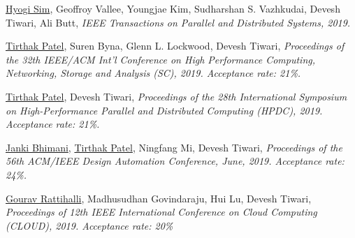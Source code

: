 
{\textnormal{\newline \underline{Hyogi Sim}, Geoffroy Vallee, Youngjae Kim, Sudharshan S. Vazhkudai, Devesh Tiwari, Ali Butt, }} {\textit{IEEE Transactions on Parallel and Distributed Systems, 2019.\newline}}{}{}{} %

{\textnormal{\newline \underline{Tirthak Patel}, Suren Byna, Glenn L. Lockwood, Devesh Tiwari,}} {\textit{Proceedings of the 32th IEEE/ACM Int'l Conference on High Performance Computing, Networking, Storage and Analysis (SC), 2019. Acceptance rate: 21\%. \newline}}{}{}{} %

{\textnormal{\newline \underline{Tirthak Patel}, Devesh Tiwari,}} {\textit{ Proceedings of the 28th International Symposium on High-Performance Parallel and Distributed Computing (HPDC), 2019. Acceptance rate: 21\%. \newline}}{}{}{} %

{\textnormal{\newline \underline{Janki Bhimani}, \underline{Tirthak Patel}, Ningfang Mi, Devesh Tiwari,}} {\textit{Proceedings of the 56th ACM/IEEE Design Automation Conference, June, 2019. Acceptance rate: 24\%.\newline}}{}{}{} %

{\textnormal{\newline \underline{Gourav Rattihalli}, Madhusudhan Govindaraju, Hui Lu, Devesh Tiwari,}} {\textit{ Proceedings of 12th IEEE International Conference on Cloud Computing (CLOUD), 2019. Acceptance rate: 20\% \newline}}{}{}{} %

